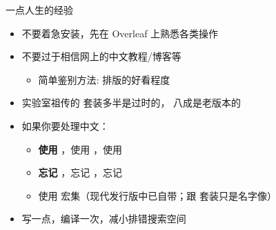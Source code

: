 \begin{frame}{一点人生的经验}
  \begin{itemize}
    \item 不要着急安装，先在 Overleaf 上熟悉各类操作
    \item 不要过于相信网上的中文教程/博客等
      \begin{itemize}
        \item 简单鉴别方法: 排版的好看程度
      \end{itemize}
    \item 实验室祖传的 \CTeX{} 套装多半是过时的，\ThuThesis{} 八成是老版本的
    \item 如果你要处理中文：
      \begin{itemize}
        \item \textbf{使用 \XeLaTeX{}}，使用 \XeLaTeX{}，使用 \XeLaTeX{}
        \item \textbf{忘记 }，忘记 ，忘记 
        \item 使用  宏集（现代发行版中已自带；跟 \CTeX{} 套装只是名字像）
      \end{itemize}
    \item 写一点，编译一次，减小排错搜索空间
  \end{itemize}
\end{frame}

